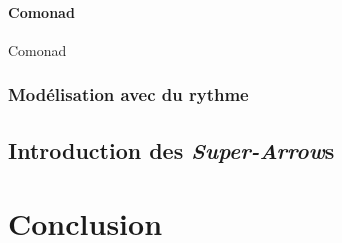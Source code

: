 \documentclass{llncs}
\newcommand{\SAs}{\emph{Super-Arrow}s }
\begin{document}
\paragraph{Comonad}
Comonad~\cite{Brookes91}~\cite{Coutts07}

\subsubsection{Modélisation avec du rythme}

\subsection{Introduction des \SAs}

\section{Conclusion}

% 

% 



\end{document}
